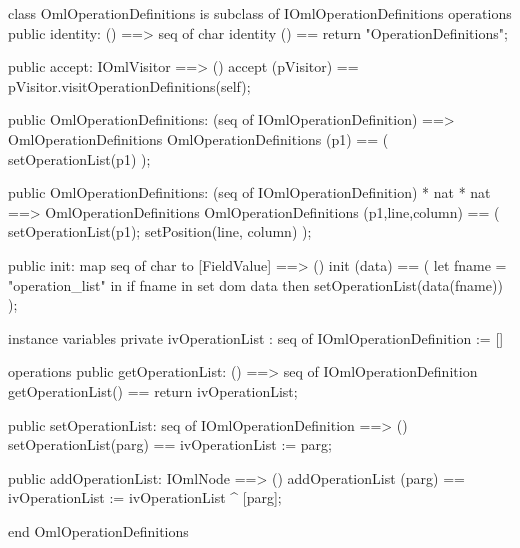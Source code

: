 \begin{vdm_al}
class OmlOperationDefinitions is subclass of IOmlOperationDefinitions
operations
  public identity: () ==> seq of char
  identity () == return "OperationDefinitions";

  public accept: IOmlVisitor ==> ()
  accept (pVisitor) == pVisitor.visitOperationDefinitions(self);

  public OmlOperationDefinitions:
    (seq of IOmlOperationDefinition) ==> OmlOperationDefinitions
  OmlOperationDefinitions (p1) == 
    ( setOperationList(p1) );

  public OmlOperationDefinitions:
    (seq of IOmlOperationDefinition) *
    nat *
    nat ==> OmlOperationDefinitions
  OmlOperationDefinitions (p1,line,column) == 
    ( setOperationList(p1);
      setPosition(line, column) );

  public init: map seq of char to [FieldValue] ==> ()
  init (data) ==
    ( let fname = "operation_list" in
        if fname in set dom data
        then setOperationList(data(fname)) );

instance variables
  private ivOperationList : seq of IOmlOperationDefinition := []

operations
  public getOperationList: () ==> seq of IOmlOperationDefinition
  getOperationList() == return ivOperationList;

  public setOperationList: seq of IOmlOperationDefinition ==> ()
  setOperationList(parg) == ivOperationList := parg;

  public addOperationList: IOmlNode ==> ()
  addOperationList (parg) == ivOperationList := ivOperationList ^ [parg];

end OmlOperationDefinitions
\end{vdm_al}

